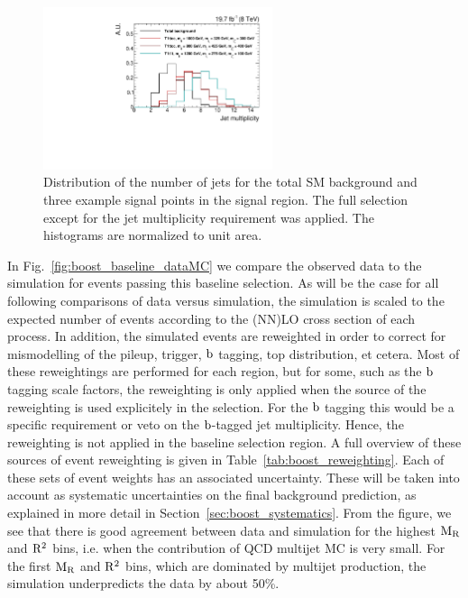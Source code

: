 \begin{figure}[htbp]
 \centering
 \includegraphics[width=0.6\textwidth]{figures/razor_selection/njets_signal_region}
 \caption{Distribution of the number of jets for the total SM background and three example signal
points in the signal region. The full selection except for the jet multiplicity requirement was
applied. The histograms are normalized to unit area.
 \label{fig:njets_sig_BG}}
\end{figure}

In Fig.~\ref{fig:boost_baseline_dataMC} we compare the observed data to the simulation for
events passing this baseline selection. 
As will be the case for all following comparisons of data versus simulation, the simulation is
scaled to the expected number of events according to the (NN)LO cross section of each process.
In addition, the simulated events are reweighted in order to correct for mismodelling of the
pileup, trigger, $\mathrm{b}$ tagging, top \pt distribution, et cetera. Most of these reweightings are
performed for each region, but for some, such as the $\mathrm{b}$ tagging scale factors, the reweighting
is only applied when the source of the reweighting is used explicitely in the selection. For the
$\mathrm{b}$ tagging this would be a specific requirement or veto on the $\mathrm{b}$-tagged jet
multiplicity. Hence, the reweighting is not applied in the baseline selection region. 
A full overview of these sources of event reweighting is given in
Table~\ref{tab:boost_reweighting}. Each of these sets of event weights has an associated
uncertainty. These will be taken into account as systematic uncertainties on the final background
prediction, as explained in more detail in Section~\ref{sec:boost_systematics}. 
From the figure, we see that there is good agreement between data and simulation for the highest
$\mathrm{M_R}$ and $\mathrm{R^2}$ bins, i.e. when the contribution of QCD multijet MC is very small. 
For the first $\mathrm{M_R}$ and $\mathrm{R^2}$ bins, which are dominated by multijet production, the simulation
underpredicts the data by about 50\%. 


